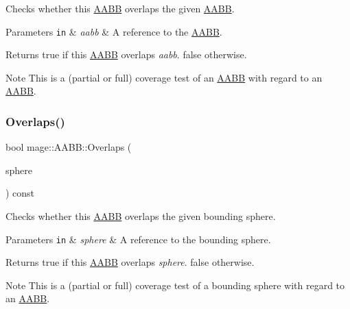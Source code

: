 Checks whether this \mbox{\hyperlink{classmage_1_1_a_a_b_b}{A\+A\+BB}} overlaps the given \mbox{\hyperlink{classmage_1_1_a_a_b_b}{A\+A\+BB}}.


\begin{DoxyParams}[1]{Parameters}
\mbox{\tt in}  & {\em aabb} & A reference to the \mbox{\hyperlink{classmage_1_1_a_a_b_b}{A\+A\+BB}}. \\
\hline
\end{DoxyParams}
\begin{DoxyReturn}{Returns}
{\ttfamily true} if this \mbox{\hyperlink{classmage_1_1_a_a_b_b}{A\+A\+BB}} overlaps {\itshape aabb}. {\ttfamily false} otherwise. 
\end{DoxyReturn}
\begin{DoxyNote}{Note}
This is a (partial or full) coverage test of an \mbox{\hyperlink{classmage_1_1_a_a_b_b}{A\+A\+BB}} with regard to an \mbox{\hyperlink{classmage_1_1_a_a_b_b}{A\+A\+BB}}. 
\end{DoxyNote}
\mbox{\label{classmage_1_1_a_a_b_b_acd344f81141b5439c3e2cf4321b6548b}} 
\subsubsection{\texorpdfstring{Overlaps()}{Overlaps()}\hspace{0.1cm}{\footnotesize\ttfamily [2/2]}}
{\footnotesize\ttfamily bool mage\+::\+A\+A\+B\+B\+::\+Overlaps (\begin{DoxyParamCaption}\item[{const \mbox{\hyperlink{classmage_1_1_bounding_sphere}{Bounding\+Sphere}} \&}]{sphere }\end{DoxyParamCaption}) const\hspace{0.3cm}{\ttfamily [noexcept]}}

Checks whether this \mbox{\hyperlink{classmage_1_1_a_a_b_b}{A\+A\+BB}} overlaps the given bounding sphere.


\begin{DoxyParams}[1]{Parameters}
\mbox{\tt in}  & {\em sphere} & A reference to the bounding sphere. \\
\hline
\end{DoxyParams}
\begin{DoxyReturn}{Returns}
{\ttfamily true} if this \mbox{\hyperlink{classmage_1_1_a_a_b_b}{A\+A\+BB}} overlaps {\itshape sphere}. {\ttfamily false} otherwise. 
\end{DoxyReturn}
\begin{DoxyNote}{Note}
This is a (partial or full) coverage test of a bounding sphere with regard to an \mbox{\hyperlink{classmage_1_1_a_a_b_b}{A\+A\+BB}}. 
\end{DoxyNote}
\mbox{\label{classmage_1_1_a_a_b_b_a00628d5ed2bf73021bbb3cdf94049580}} 
